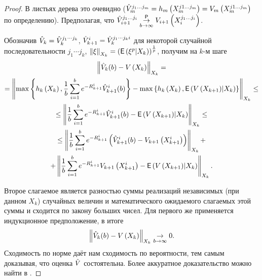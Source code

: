 	\begin{proof}
		\par В листьях дерева это очевидно ($\hat{V}_m^{j_1 \ldots j_m} = h_m\left(X_m^{j1 \ldots j_m}\right) = V_m\left(X_m^{j1 \ldots j_m}\right)$ по определению). Предполагая, что $\hat{V}_{i+1}^{j_1\ldots j_i} \underset{b\to\infty}{\overset{\mathsf{P}}{\to}} V_{i+1}\left(X_i^{j_1\ldots j_i}\right)$. 

		Обозначив $\hat{V}_k = \hat{V}_k^{j_1\cdots j_k}$, $\hat{V}_{k+1}^i = \hat{V}_k^{j_1\cdots j_k i}$ для некоторой случайной последовательности $j_1\cdots j_k$, $\left\lVert\xi\right\rVert_{X_k} = \left(\mathsf{E}\left(\xi^p\middle\vert X_k\right)\right)^{1\over p}$, получим на $k$-м шаге
		\begin{multline*}
			\left\lVert\hat{V}_k(b) - V\left(X_k\right)\right\rVert_{X_k} = \\ 
			= \left\lVert
				\max\left\lbrace
					h_k\left(X_k\right), \frac{1}{b}\sum_{i=1}^b e^{-R_{k+1}^i} \hat{V}_{k+1}^i(b)
				\right\rbrace - \max\left\lbrace
					h_k\left(X_k\right), \mathsf{E}\left(V\left(X_{k+1}\right) \middle\vert X_k\right)\right\rbrace
			\right\rVert_{X_k} \leq \\
			\leq \left\lVert\frac{1}{b}\sum_{i=1}^b e^{-R_{k+1}^i} \hat{V}_{k+1}^i(b) - \mathsf{E}\left(V\left(X_{k+1}\right) \middle\vert X_k\right)\right\rVert_{X_k} \leq \\
			\leq \left\lVert
				\frac{1}{b}\sum_{i=1}^b e^{-R_{k+1}^i}
				\left(\hat{V}_{k+1}^i(b) - V_{k+1}\left(X_{k+1}^i\right)\right)
			\right\rVert_{X_k} + \\ +\left\lVert
				\frac{1}{b}\sum_{i=1}^b e^{-R_{k+1}^i} V_{k+1}\left(X_{k+1}^i\right) - 
				\mathsf{E}\left(V\left(X_{k+1}\right) \middle\vert X_k\right)
			\right\rVert_{X_k}.
		\end{multline*}

		Второе слагаемое является разностью суммы реализаций независимых (при данном $X_k$) случайных величин и математического ожидаемого слагаемых этой суммы и сходится по закону больших чисел. Для первого же применяется индукционное предположение, в итоге $$\left\lVert\hat{V}_k(b) - V\left(X_k\right)\right\rVert_{X_k} \underset{b\to\infty}{\to} 0.$$
	Сходимость по норме даёт нам сходимость по вероятности, тем самым доказывая, что оценка $\hat{V}$ состоятельна. Более аккуратное доказательство можно найти в \cite{Broadie1997}.
	\end{proof}
